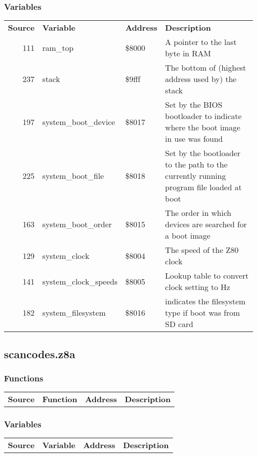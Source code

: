 \subsubsection{Variables}
\begin{tabular}{rllp{7cm}}
 \textbf{Source}&\textbf{Variable}&\textbf{Address}&\textbf{Description}\\
 111&ram\_top&\$8000&A pointer to the last byte in RAM\\
 237&stack&\$9fff&The bottom of (highest address used by) the stack\\
 197&system\_boot\_device&\$8017&Set by the BIOS bootloader to indicate where the boot image in use was found\\
 225&system\_boot\_file&\$8018&Set by the bootloader to the path to the currently running program file loaded at boot\\
 163&system\_boot\_order&\$8015&The order in which devices are searched for a boot image\\
 129&system\_clock&\$8004&The speed of the Z80 clock\\
 141&system\_clock\_speeds&\$8005&Lookup table to convert clock setting to Hz\\
 182&system\_filesystem&\$8016&indicates the filesystem type if boot was from SD card\\
\end{tabular}

\subsection{scancodes.z8a}
\subsubsection{Functions}
\begin{tabular}{rllp{7cm}}
 \textbf{Source}&\textbf{Function}&\textbf{Address}&\textbf{Description}\\
\end{tabular}

\subsubsection{Variables}
\begin{tabular}{rllp{7cm}}
 \textbf{Source}&\textbf{Variable}&\textbf{Address}&\textbf{Description}\\
\end{tabular}

